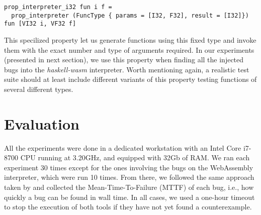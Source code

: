 \documentclass[acmsmall, anonymous]{acmart}
\newcommand{\mutagen}{\textsc{Mutagen}\xspace}
\begin{document}
\begin{verbatim}
prop_interpreter_i32 fun i f =
  prop_interpreter (FuncType { params = [I32, F32], result = [I32]}) fun [VI32 i, VF32 f]
\end{verbatim}

This specilized property let us generate functions using this fixed type and
invoke them with the exact number and type of arguments required.
%
In our experiments (presented in next section), we use this property when
finding all the injected bugs into the \textit{haskell-wasm} interpreter.
%
Worth mentioning again, a realistic test suite should at least include different
variants of this property testing functions of several different types.




\section{Evaluation}
\label{sec:evaluation}

All the experiments were done in a dedicated workstation with an Intel Core
i7-8700 CPU running at 3.20GHz, and equipped with 32Gb of RAM.
%
We ran each experiment 30 times except for the ones involving the bugs on the
WebAssembly interpreter, which were run 10 times.
%
From there, we followed the same approach taken by
\citeauthor{lampropoulos2019coverage} and collected the Mean-Time-To-Failure
(MTTF) of each bug, i.e., how quickly a bug can be found in wall time.
%
In all cases, we used a one-hour timeout to stop the execution of both tools if
they have not yet found a counterexample.
\end{document}
